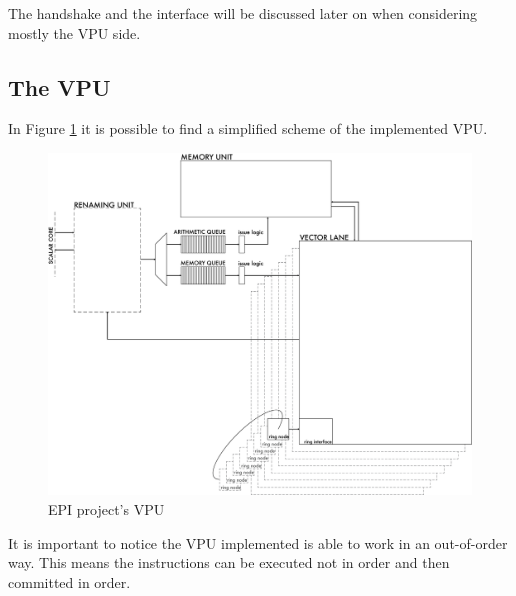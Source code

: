 The handshake and the interface will be discussed later on when considering mostly the VPU side.



\subsection{The VPU}
In Figure \ref{VPU} it is possible to find a simplified scheme of the implemented VPU.\\

\begin{figure}[H]
    \centering
    \includegraphics[scale = 0.4]{Chapter_1/img/VPU.png}
    \caption{EPI project's VPU}
    \label{VPU}
\end{figure}
It is important to notice the VPU implemented is able to work in an out-of-order way. This means the instructions can be executed not in order and then committed in order.\\


